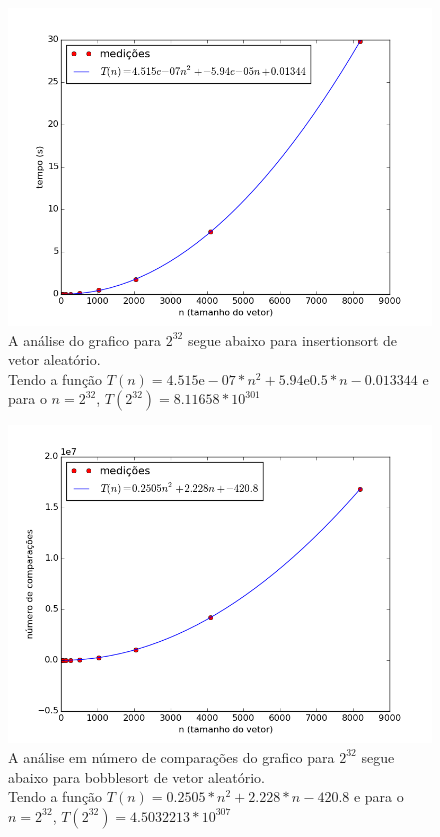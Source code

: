 \documentclass[12pt,a4paper,twoside]{report}
\begin{document}
\begin{figure}[ht]
\centering \includegraphics[scale=0.8]{../insertionsort/imagens/insertionsortAleatorio0.png}
\caption{A análise do grafico para $2^{32}$ segue abaixo para insertionsort de vetor aleatório.\\
Tendo a função $T(n) = 4.515\mathrm{e}-07*n^2+5.94\mathrm{e}0.5*n-0.013344$ e para o $n =2^{32}$, $T(2^{32}) = 8.11658 * 10^{301}$}
\label{fig:bolhaAleatorio0}
\end{figure}

\begin{figure}[ht]
\centering \includegraphics[scale=0.8]{../insertionsort/imagens/insertionsortAleatorio1.png}
\caption{A análise em número de comparações do grafico para $2^{32}$ segue abaixo para bobblesort de vetor aleatório.\\
Tendo a função $T(n) = 0.2505*n^2 + 2.228*n - 420.8$ e para o $n =2^{32}$, $T(2^{32}) = 4.5032213 * 10^{307}$}
\label{fig:bolhaAleatorio1}
\end{figure}
\end{document}
